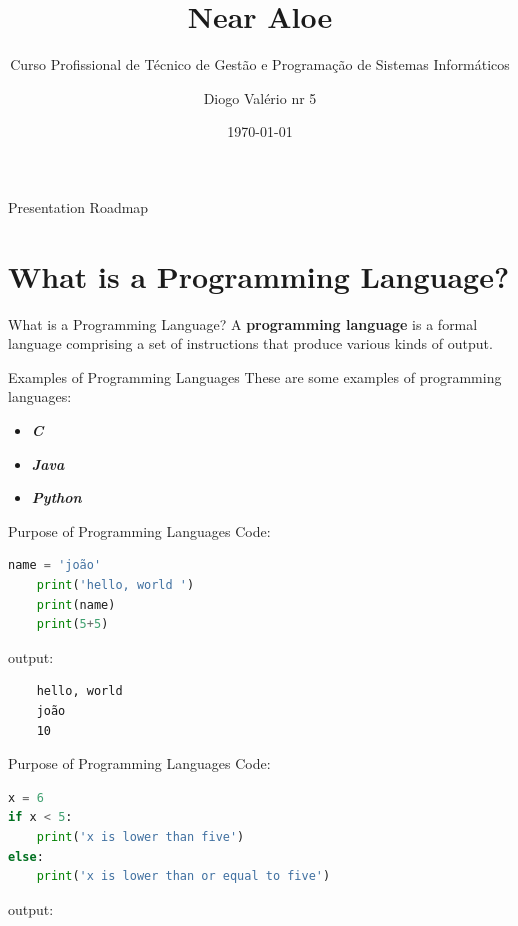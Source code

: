 \documentclass[compress]{beamer}
\title{Near Aloe}
\subtitle{Curso Profissional de Técnico de Gestão e Programação de Sistemas Informáticos}
\author{Diogo Valério nr 5}
\institute{Escola Secundária António Damásio}
\date{\today}
\begin{document}
\begin{frame}
  \maketitle
\end{frame}
\begin{frame}{Presentation Roadmap}
    \tableofcontents[]
\end{frame}


\section{What is a Programming Language?}
\begin{frame}{What is a Programming Language?}
A \textbf{programming language} is a formal language comprising a set of instructions that produce various kinds of output.
\end{frame}

\begin{frame}{Examples of Programming Languages}
These are some examples of programming languages:
\begin{itemize}
    \item \textit{\textbf{C}}
    \item \textit{\textbf{Java}}
    \item \textit{\textbf{Python}}
\end{itemize}
\end{frame}

\begin{frame}[fragile]{Purpose of Programming Languages}
Code:
\begin{lstlisting}[language=python]
    name = 'joão'
    print('hello, world ')
    print(name)
    print(5+5)
\end{lstlisting}
output:
\begin{lstlisting}
    hello, world 
    joão
    10
\end{lstlisting}
\end{frame}

\begin{frame}[fragile]{Purpose of Programming Languages}
Code:
\begin{lstlisting}[language=python]
x = 6
if x < 5:
    print('x is lower than five')
else:
    print('x is lower than or equal to five')
\end{lstlisting}
output:
\begin{lstlisting}
    
\end{lstlisting}
\end{frame}
\end{document}
